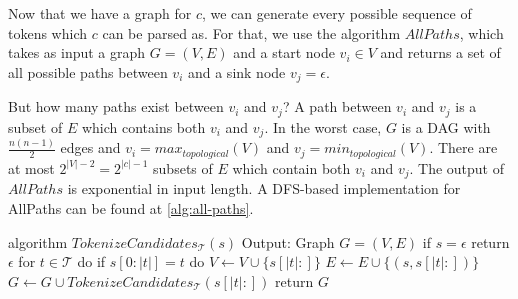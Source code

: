 Now that we have a graph for $c$, we can generate every possible sequence of tokens which $c$ can be parsed as.
For that, we use the algorithm $AllPaths$, which takes as input a graph $G = (V, E)$ and a start node $v_i \in V$ and returns a set of all possible paths between $v_i$ and a sink node $v_j = \epsilon$.

But how many paths exist between $v_i$ and $v_j$? A path between $v_i$ and $v_j$ is a subset of $E$ which contains both $v_i$ and $v_j$.
In the worst case, $G$ is a DAG with $\frac{n(n-1)}{2}$ edges and $v_i = max_{topological}(V)$ and $v_j = min_{topological}(V)$.
There are at most $2^{|V|-2} = 2^{|c|-1}$ subsets of $E$ which contain both $v_i$ and $v_j$.
The output of $AllPaths$ is exponential in input length.
A DFS-based implementation for AllPaths can be found at \autoref{alg:all-paths}.

\begin{Pseudocode}[float,caption={TokenizeCandidates algorithm},label={alg:tokenize-candidates}]
	algorithm $TokenizeCandidates_{\mathcal{T}}(s)$
		Output: Graph $G = (V, E)$
		if $s = \epsilon$
			return $\epsilon$
		for $t \in \mathcal{T}$ do
			if $s[0{:}|t|] = t$ do
				$V \leftarrow V \cup \{ s[|t|{:}] \}$
				$E \leftarrow E \cup \{ (s, s[|t|{:}]) \}$
				$G \leftarrow G \cup TokenizeCandidates_{\mathcal{T}}(s[|t|{:}])$
		return $G$
\end{Pseudocode}

